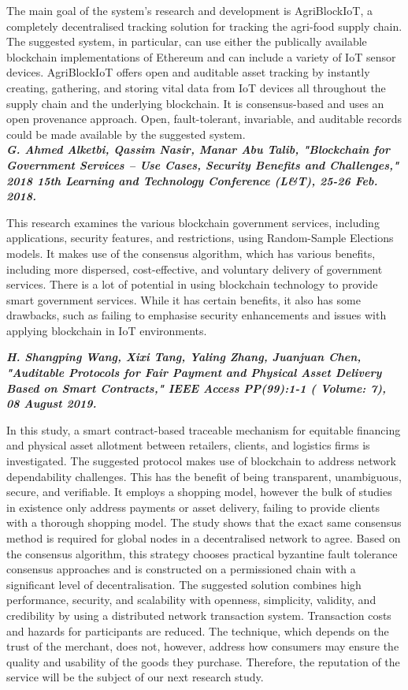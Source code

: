 \documentclass[12pt,a4paper,twocolumn,fleqn]{article}
\begin{document}
The main goal of the system's research and development is AgriBlockIoT, a completely decentralised tracking solution for tracking the agri-food supply chain. The suggested system, in particular, can use either the publically available blockchain implementations of Ethereum and can include a variety of IoT sensor devices. AgriBlockIoT offers open and auditable asset tracking by instantly creating, gathering, and storing vital data from IoT devices all throughout the supply chain and the underlying blockchain. It is consensus-based and uses an open provenance approach. Open, fault-tolerant, invariable, and auditable records could be made available by the suggested system. \\

\textbf{\emph {G. Ahmed Alketbi, Qassim Nasir, Manar Abu Talib, "Blockchain for Government Services – Use Cases, Security Benefits and Challenges," 2018 15th Learning and Technology Conference (L\&T), 25-26 Feb. 2018.}}

This research examines the various blockchain government services, including applications, security features, and restrictions, using Random-Sample Elections models. It makes use of the consensus algorithm, which has various benefits, including more dispersed, cost-effective, and voluntary delivery of government services. There is a lot of potential in using blockchain technology to provide smart government services. While it has certain benefits, it also has some drawbacks, such as failing to emphasise security enhancements and issues with applying blockchain in IoT environments.

\textbf{\emph {H. Shangping Wang, Xixi Tang, Yaling Zhang, Juanjuan Chen, "Auditable Protocols for Fair Payment and Physical Asset Delivery Based on Smart Contracts," IEEE Access PP(99):1-1 ( Volume: 7), 08 August 2019.}}

In this study, a smart contract-based traceable mechanism for equitable financing and physical asset allotment between retailers, clients, and logistics firms is investigated. The suggested protocol makes use of blockchain to address network dependability challenges. This has the benefit of being transparent, unambiguous, secure, and verifiable. It employs a shopping model, however the bulk of studies in existence only address payments or asset delivery, failing to provide clients with a thorough shopping model. The study shows that the exact same consensus method is required for global nodes in a decentralised network to agree. Based on the consensus algorithm, this strategy chooses practical byzantine fault tolerance consensus approaches and is constructed on a permissioned chain with a significant level of decentralisation. The suggested solution combines high performance, security, and scalability with openness, simplicity, validity, and credibility by using a distributed network transaction system. Transaction costs and hazards for participants are reduced. The technique, which depends on the trust of the merchant, does not, however, address how consumers may ensure the quality and usability of the goods they purchase. Therefore, the reputation of the service will be the subject of our next research study. \\
\end{document}
